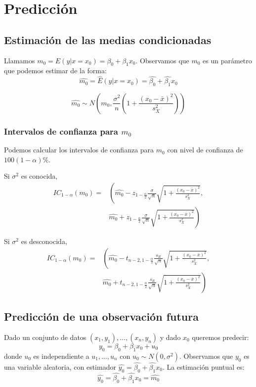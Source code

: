 \section{Predicción}

\subsection*{Estimación de las medias condicionadas}
Llamamos $m_0 = E(y | x=x_0) = \beta_0 + \beta_1x_0$.
Observamos que $m_0$ es un parámetro que podemos estimar de la forma:
$$\hat{m_0} = \hat{E}(y | x=x_0) = \hat{\beta_0} + \hat{\beta_1}x_0$$

\begin{theorem}
    $$\hat{m_0} \sim N\left( m_0, \frac{\sigma^2}{n} \left(1+\frac{(x_0-\bar{x})^2}{s_X^2}\right) \right)$$
\end{theorem}

\subsubsection*{Intervalos de confianza para $m_0$}
Podemos calcular los intervalos de confianza para $m_0$ con nivel de confianza de $100(1-\alpha)\%$.

Si $\sigma^2$ es conocida,
\begin{align*}
    IC_{1-\alpha}(m_0) = & \left( \hat{m_0} - z_{1-\frac{\alpha}{2}} \frac{\sigma}{\sqrt{n}} \sqrt{1 + \frac{(x_0-\bar{x})^2}{s_X^2}}, \right. \\
                         & \left. \hat{m_0} + z_{1-\frac{\alpha}{2}} \frac{\sigma}{\sqrt{n}} \sqrt{1 + \frac{(x_0-\bar{x})^2}{s_X^2}} \right)
\end{align*}

Si $\sigma^2$ es desconocida,
\begin{align*}
    IC_{1-\alpha}(m_0) = & \left( \hat{m_0} - t_{n-2, 1-\frac{\alpha}{2}} \frac{s_R}{\sqrt{n}} \sqrt{1 + \frac{(x_0-\bar{x})^2}{s_X^2}}, \right. \\
                         & \left. \hat{m_0} + t_{n-2, 1-\frac{\alpha}{2}} \frac{s_R}{\sqrt{n}} \sqrt{1 + \frac{(x_0-\bar{x})^2}{s_X^2}} \right)
\end{align*}

\subsection*{Predicción de una observación futura}
Dado un conjunto de datos $(x_1, y_1), \dots, (x_n, y_n)$ y dado $x_0$ queremos predecir:
$$y_0 = \beta_0 + \beta_1 x_0 + u_0$$
donde $u_0$ es independiente a $u_1, \dots, u_n$ con $u_0 \sim N(0, \sigma^2)$.
Observamos que $y_0$ es una variable aleatoria, con estimador $\hat{y_0} = \hat{\beta_0} + \hat{\beta_1}x_0$.
La estimación puntual es:
$$\hat{y_0} = \hat{\beta_0} + \hat{\beta_1}x_0 = \hat{m_0}$$

